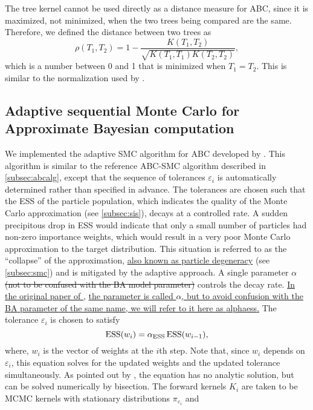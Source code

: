 The tree kernel cannot be used directly as a distance measure for \gls{ABC},
since it is maximized, not minimized, when the two trees being compared are the
same. Therefore, we defined the distance between two trees as
\[
  \rho(T_1, T_2) = 1 - \frac{K(T_1, T_2)}{\sqrt{K(T_1, T_1) K(T_2, T_2)}},
\]
which is a number between 0 and 1 that is minimized when $T_1 = T_2$. This is
similar to the normalization used by \textcite{collins2002new,
poon2013mapping}.

\subsection{Adaptive sequential Monte Carlo for Approximate Bayesian computation}
\label{subsec:adaptsmc}

We implemented the adaptive \gls{SMC} algorithm for \gls{ABC} developed by
\textcite{del2012adaptive}. This algorithm is similar to the reference
\gls{ABC}-\gls{SMC} algorithm described in \cref{subsec:abcalg}, except that
the sequence of tolerances $\varepsilon_i$ is automatically determined rather
than specified in advance. The tolerances are chosen such that the \gls{ESS} of
the particle population, which indicates the quality of the Monte Carlo
approximation (see \cref{subsec:sis}), decays at a controlled rate. A
sudden precipitous drop in \gls{ESS} would indicate that only a small number of
particles had non-zero importance weights, which would result in a very poor
Monte Carlo approximation to the target distribution. This situation is
referred to as the ``collapse'' of the approximation, {\color{blue}\uline{also
known as particle degeneracy} (see \cref{subsec:smc})} and is mitigated by the
adaptive approach. A single parameter {\color{red}\sout{$\alpha$ (not to be
confused with the \gls{BA} model parameter)}} controls the decay rate.
{\color{blue}\uline{In the original paper of }\textcite{del2012adaptive},
\uline{the parameter is called $\alpha$, but to avoid confusion with the
\gls{BA} parameter of the same name, we will refer to it here as
\gls{alphaess}.}}
The tolerance $\varepsilon_i$ is chosen to satisfy
\[
  \operatorname{ESS}(w_i) = \alpha_{\operatorname{ESS}} \operatorname{ESS}(w_{i-1}),
\]
where, $w_i$ is the vector of weights at the $i$th step. Note that, since $w_i$
depends on $\varepsilon_i$, this equation solves for the updated weights and
the updated tolerance simultaneously. As pointed out by
\textcite{del2012adaptive}, the equation has no analytic solution, but can be
solved numerically by bisection. The forward kernels $K_i$ are taken to be
\gls{MCMC} kernels with stationary distributions $\pi_{\varepsilon_i}$ and
